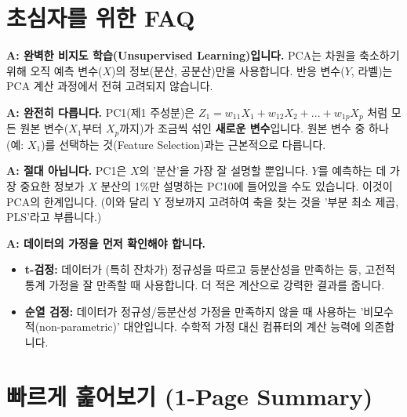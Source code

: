 \documentclass[11pt,a4paper]{book}
\theoremstyle{definition}
\begin{document}
\section{초심자를 위한 FAQ}

\begin{keyconcept}[title={Q: PCA는 지도학습인가요, 비지도학습인가요?}]
\textbf{A: 완벽한 비지도 학습(Unsupervised Learning)입니다.}
PCA는 차원을 축소하기 위해 오직 예측 변수($X$)의 정보(분산, 공분산)만을 사용합니다. 반응 변수($Y$, 라벨)는 PCA 계산 과정에서 전혀 고려되지 않습니다.
\end{keyconcept}

\begin{keyconcept}[title={Q: 주성분(PC)은 원본 변수와 다른가요?}]
\textbf{A: 완전히 다릅니다.}
PC1(제1 주성분)은 $Z_1 = w_{11}X_1 + w_{12}X_2 + ... + w_{1p}X_p$ 처럼 모든 원본 변수($X_1$부터 $X_p$까지)가 조금씩 섞인 \textbf{새로운 변수}입니다. 원본 변수 중 하나(예: $X_1$)를 선택하는 것(Feature Selection)과는 근본적으로 다릅니다.
\end{keyconcept}

\begin{keyconcept}[title={Q: PC1이 항상 Y를 가장 잘 예측하나요?}]
\textbf{A: 절대 아닙니다.}
PC1은 $X$의 '분산'을 가장 잘 설명할 뿐입니다. $Y$를 예측하는 데 가장 중요한 정보가 $X$ 분산의 1\%만 설명하는 PC10에 들어있을 수도 있습니다. 이것이 PCA의 한계입니다. (이와 달리 Y 정보까지 고려하여 축을 찾는 것을 '부분 최소 제곱, PLS'라고 부릅니다.)
\end{keyconcept}

\begin{keyconcept}[title={Q: t-검정과 순열 검정 중 무엇을 써야 하나요?}]
\textbf{A: 데이터의 가정을 먼저 확인해야 합니다.}
\begin{itemize}
    \item \textbf{t-검정:} 데이터가 (특히 잔차가) 정규성을 따르고 등분산성을 만족하는 등, 고전적 통계 가정을 잘 만족할 때 사용합니다. 더 적은 계산으로 강력한 결과를 줍니다.
    \item \textbf{순열 검정:} 데이터가 정규성/등분산성 가정을 만족하지 않을 때 사용하는 '비모수적(non-parametric)' 대안입니다. 수학적 가정 대신 컴퓨터의 계산 능력에 의존합니다.
\end{itemize}
\end{keyconcept}


\section{빠르게 훑어보기 (1-Page Summary)}
\end{document}
